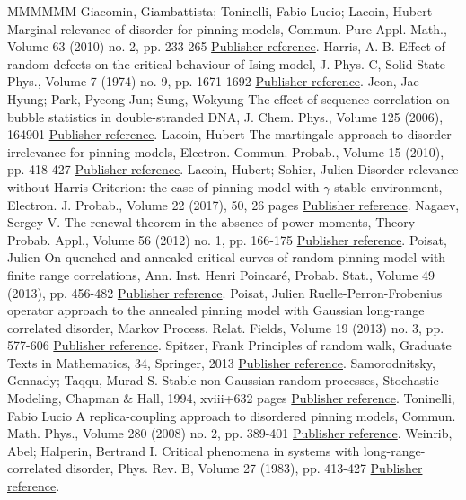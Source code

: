 \documentclass[11pt]{article}
\theoremstyle{definition}
\numberwithin{equation}{section}
\numberwithin{figure}{section}
\numberwithin{table}{section}
\begin{document}
\begin{thebibliography}{MMMMMM}
 Giacomin, Giambattista; Toninelli, Fabio Lucio; Lacoin, Hubert Marginal relevance of disorder for pinning models, Commun. Pure Appl. Math., Volume 63 (2010) no. 2, pp. 233-265 \href{https://ahl.centre-mersenne.org/item/AHL_2019__2__281_0/#GTL09}{Publisher reference}.
 Harris, A. B. Effect of random defects on the critical behaviour of Ising model, J. Phys. C, Solid State Phys., Volume 7 (1974) no. 9, pp. 1671-1692 \href{https://ahl.centre-mersenne.org/item/AHL_2019__2__281_0/#H74}{Publisher reference}.
 Jeon, Jae-Hyung; Park, Pyeong Jun; Sung, Wokyung The effect of sequence correlation on bubble statistics in double-stranded DNA, J. Chem. Phys., Volume 125 (2006), 164901 \href{https://ahl.centre-mersenne.org/item/AHL_2019__2__281_0/#JPS06}{Publisher reference}.
 Lacoin, Hubert The martingale approach to disorder irrelevance for pinning models, Electron. Commun. Probab., Volume 15 (2010), pp. 418-427 \href{https://ahl.centre-mersenne.org/item/AHL_2019__2__281_0/#L10}{Publisher reference}.
 Lacoin, Hubert; Sohier, Julien Disorder relevance without Harris Criterion: the case of pinning model with \(\gamma\)-stable environment, Electron. J. Probab., Volume 22 (2017), 50, 26 pages \href{https://ahl.centre-mersenne.org/item/AHL_2019__2__281_0/#LS16+}{Publisher reference}.
 Nagaev, Sergey V. The renewal theorem in the absence of power moments, Theory Probab. Appl., Volume 56 (2012) no. 1, pp. 166-175 \href{https://ahl.centre-mersenne.org/item/AHL_2019__2__281_0/#Na2012}{Publisher reference}.
 Poisat, Julien On quenched and annealed critical curves of random pinning model with finite range correlations, Ann. Inst. Henri Poincaré, Probab. Stat., Volume 49 (2013), pp. 456-482 \href{https://ahl.centre-mersenne.org/item/AHL_2019__2__281_0/#P13a}{Publisher reference}.
 Poisat, Julien Ruelle-Perron-Frobenius operator approach to the annealed pinning model with Gaussian long-range correlated disorder, Markov Process. Relat. Fields, Volume 19 (2013) no. 3, pp. 577-606 \href{https://ahl.centre-mersenne.org/item/AHL_2019__2__281_0/#P13}{Publisher reference}.
 Spitzer, Frank Principles of random walk, Graduate Texts in Mathematics, 34, Springer, 2013 \href{https://ahl.centre-mersenne.org/item/AHL_2019__2__281_0/#Spitzer}{Publisher reference}.
 Samorodnitsky, Gennady; Taqqu, Murad S. Stable non-Gaussian random processes, Stochastic Modeling, Chapman \& Hall, 1994, xviii+632 pages \href{https://ahl.centre-mersenne.org/item/AHL_2019__2__281_0/#ST94}{Publisher reference}.
 Toninelli, Fabio Lucio A replica-coupling approach to disordered pinning models, Commun. Math. Phys., Volume 280 (2008) no. 2, pp. 389-401 \href{https://ahl.centre-mersenne.org/item/AHL_2019__2__281_0/#T08}{Publisher reference}.
 Weinrib, Abel; Halperin, Bertrand I. Critical phenomena in systems with long-range-correlated disorder, Phys. Rev. B, Volume 27 (1983), pp. 413-427 \href{https://ahl.centre-mersenne.org/item/AHL_2019__2__281_0/#WH83}{Publisher reference}.
\end{thebibliography}
\end{document}
